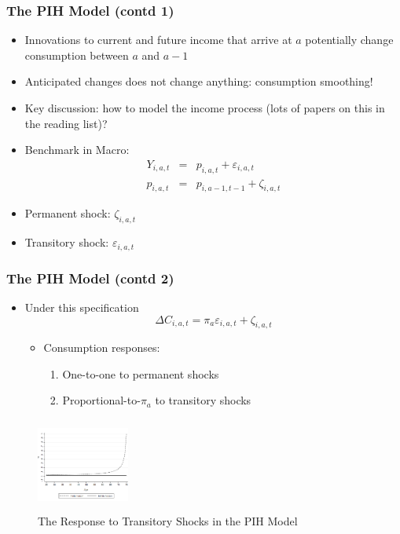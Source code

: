 \begin{frame}
	\frametitle{The PIH Model (contd 1)}
		\begin{itemize}
			\item Innovations to current and future income that arrive at $a$ potentially change consumption between $a$ and $a-1$
			\item Anticipated changes does not change anything: consumption smoothing!
			\item Key discussion: how to model the income process (lots of papers on this in the reading list)?
			\item Benchmark in Macro:
			\begin{eqnarray}
			Y_{i,a,t} &=& p_{i,a,t} + \varepsilon_{i,a,t} \nonumber \\
			p_{i,a,t} &=& p_{i,a-1,t-1} + \zeta_{i,a,t} \nonumber
			\end{eqnarray}
			\item Permanent shock: $\zeta_{i,a,t}$
			\item Transitory shock: $\varepsilon_{i,a,t}$
		\end{itemize}
\end{frame}

\begin{frame}
	\frametitle{The PIH Model (contd 2)}
		\begin{itemize}
			\item Under this specification
				\begin{equation}
					\Delta C_{i,a,t} = \pi_{a} \varepsilon_{i,a,t} + \zeta_{i,a,t} 
				\end{equation}
				\begin{itemize}
			\item Consumption responses:
					\begin{enumerate}
						\item One-to-one to permanent shocks
						\item Proportional-to-$\pi_{a}$ to transitory shocks
					\end{enumerate}
				\end{itemize}
		\end{itemize}
			
\begin{center}
\begin{figure}[H]
\caption*{The Response to Transitory Shocks in the PIH Model}
\centering
\includegraphics[width=1.2in, height=1.2in]{Figure1MP_2011.png}
\end{figure}
\end{center}		
		
\end{frame}

